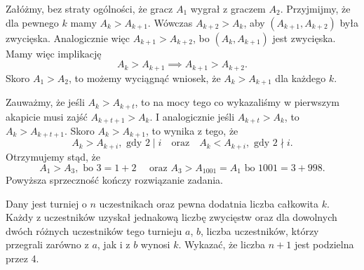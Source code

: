 \noindent
Załóżmy, bez straty ogólności, że gracz $A_1$ wygrał z graczem $A_2$. 
Przyjmijmy, że dla pewnego $k$ mamy $A_k > A_{k + 1}$. Wówczas $A_{k + 2} > A_k$, aby $(A_{k + 1}, A_{k + 2})$ była zwycięska. Analogicznie więc $A_{k + 1} > A_{k + 2}$, bo $(A_k, A_{k + 1})$ jest zwycięska. Mamy więc implikację 
\[
	A_k > A_{k + 1} \implies A_{k + 1} > A_{k + 2}.
\]
Skoro $A_1 > A_2$, to możemy wyciągnąć wniosek, że $A_k > A_{k + 1}$ dla każdego $k$.

\vspace{10px}

\begin{center}
\end{center}

\noindent
Zauważmy, że jeśli $A_k > A_{k + t}$, to na mocy tego co wykazaliśmy w pierwszym akapicie musi zajść $A_{k + t + 1} > A_k$. I analogicznie jeśli $A_{k + t} > A_k$, to $A_k > A_{k + t + 1}$. Skoro ${A_k > A_{k + 1}}$, to wynika z tego, że
\[
	A_k > A_{k + i}, \text{ gdy } 2 \mid i \quad \text{oraz} \quad A_k < A_{k + i}, \text{ gdy } 2 \nmid i.
\]
Otrzymujemy stąd, że
\[
	A_1 > A_{3}, \text{ bo } 3 = 1 + 2 \quad \text{ oraz } A_3 > A_{1001} = A_{1}  \text{ bo } 1001 = 3 + 998.
\]
Powyższa sprzeczność kończy rozwiązanie zadania.

\begin{problem}{5}
	Dany jest turniej o $n$ uczestnikach oraz pewna dodatnia liczba całkowita $k$. Każdy z uczestników uzyskał jednakową liczbę zwycięstw oraz dla dowolnych dwóch różnych uczestników tego turnieju $a$, $b$, liczba uczestników, którzy przegrali zarówno z $a$, jak i z $b$ wynosi $k$. Wykazać, że liczba $n + 1$ jest podzielna przez 4.
\end{problem}

